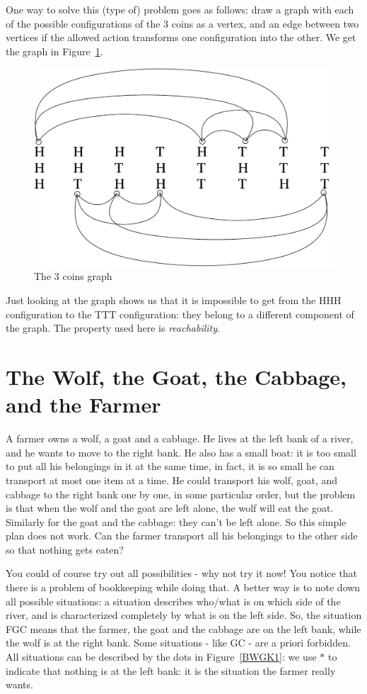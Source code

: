 One way to solve this (type of) problem goes as follows: draw a graph
with each of the possible configurations of the 3 coins as a vertex,
and an edge between two vertices if the allowed action transforms one
configuration into the other. We get the graph in Figure~\ref{munten}.

\begin{figure}[ht]
\begin{center}
\includegraphics[width=0.5\linewidth,keepaspectratio]{munteneng}
\end{center}
\caption{The 3 coins graph \label{munten}}
\end{figure}

Just looking at the graph shows us that it is impossible to get from
the HHH configuration to the TTT configuration: they belong to a
different component of the graph. The property used here is {\em
reachability}.


\section{The Wolf, the Goat, the Cabbage, and the Farmer}

A farmer owns a wolf, a goat and a cabbage. He lives at the left bank
of a river, and he wants to move to the right bank. He also has a
small boat: it is too small to put all his belongings in it at the
same time, in fact, it is so small he can transport at most one
item at a time. He could transport his wolf, goat, and
cabbage to the right bank one by one, in some particular order, but the problem
is that when the wolf and the goat are left alone, the wolf will eat
the goat. Similarly for the goat and the cabbage: they can't be left
alone. So this simple plan does not work. Can the farmer transport all
his belongings to the other side so that nothing gets eaten?

You could of course try out all possibilities - why not try it now!
You notice that there is a problem of bookkeeping while doing that.
A better way is to note down all possible situations: a situation
describes who/what is on which side of the river, and is characterized
completely by what is on the left side. So, the situation FGC means
that the farmer, the goat and the cabbage are on the left bank, while
the wolf is at the right bank. Some situations - like GC - are a
priori forbidden. All situations can be described by the dots in
Figure~\ref{BWGK1}: we use $\ast$ to indicate that nothing is at the
left bank: it is the situation the farmer really wants.

